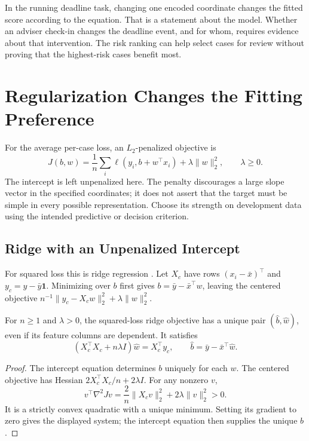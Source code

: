 In the running deadline task, changing one encoded coordinate changes the fitted score according to the equation. That is a statement about the model. Whether an adviser check-in changes the deadline event, and for whom, requires evidence about that intervention. The risk ranking can help select cases for review without proving that the highest-risk cases benefit most.

\section{Regularization Changes the Fitting Preference}

For the average per-case loss, an $L_2$-penalized objective is
\[
J(b,w)=\frac1n\sum_i\ell(y_i,b+w^\top x_i)+\lambda\|w\|_2^2,
\qquad\lambda\geq0.
\]
The intercept is left unpenalized here. The penalty discourages a large slope vector in the specified coordinates; it does not assert that the target must be simple in every possible representation. Choose its strength on development data using the intended predictive or decision criterion.

\subsection{Ridge with an Unpenalized Intercept}

For squared loss this is ridge regression \citep{hoerl1970}. Let $X_c$ have rows $(x_i-\bar x)^\top$ and $y_c=y-\bar y\mathbf1$. Minimizing over $b$ first gives $b=\bar y-\bar x^\top w$, leaving the centered objective $n^{-1}\|y_c-X_cw\|_2^2+\lambda\|w\|_2^2$.

\par\medskip\noindent\begin{minipage}{\linewidth}
\begin{theorem}
For $n\geq1$ and $\lambda>0$, the squared-loss ridge objective has a unique pair $(\hat b,\hat w)$, even if its feature columns are dependent. It satisfies
\[
(X_c^\top X_c+n\lambda I)\hat w=X_c^\top y_c,
\qquad \hat b=\bar y-\bar x^\top\hat w.
\]
\end{theorem}
\begin{proof}
The intercept equation determines $b$ uniquely for each $w$. The centered objective has Hessian $2X_c^\top X_c/n+2\lambda I$. For any nonzero $v$,
\[
v^\top\nabla^2Jv=\frac2n\|X_cv\|_2^2+2\lambda\|v\|_2^2>0.
\]
It is a strictly convex quadratic with a unique minimum. Setting its gradient to zero gives the displayed system; the intercept equation then supplies the unique $b$.
\end{proof}
\end{minipage}\par\medskip


